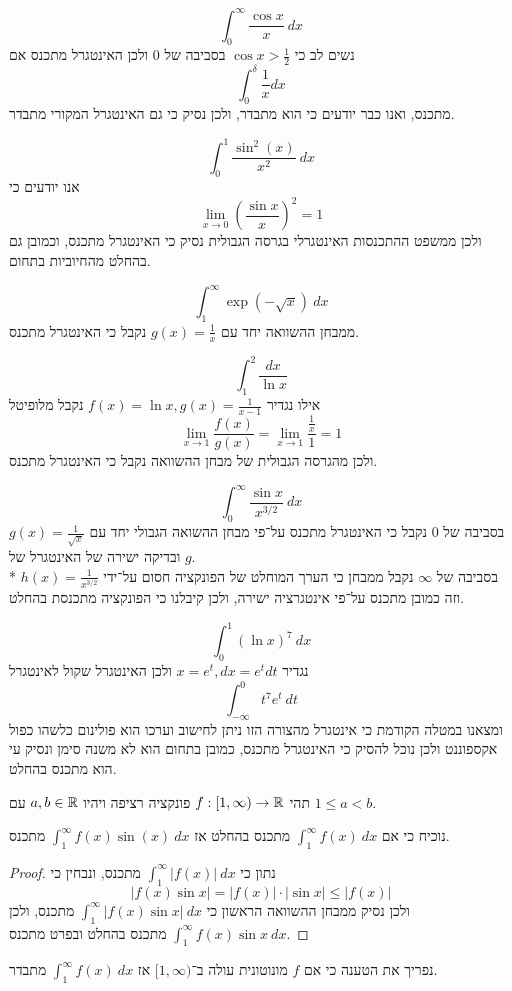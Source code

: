 \Subquestion{}
\[
	\int_{0}^{\infty} \frac{\cos x}{x}\ dx
\]
נשים לב כי $\cos x > \frac{1}{2}$ בסביבה של $0$ ולכן האינטגרל מתכנס אם
\[
	\int_{0}^{\delta} \frac{1}{x} dx
\]
מתכנס, ואנו כבר יודעים כי הוא מתבדר, ולכן נסיק כי גם האינטגרל המקורי מתבדר.

\Subquestion{}
\[
	\int_{0}^{1} \frac{\sin^2(x)}{x^2}\ dx
\]
אנו יודעים כי
\[
	\lim_{x \to 0} {(\frac{\sin x}{x})}^2 = 1
\]
ולכן ממשפט ההתכנסות האינטגרלי בגרסה הגבולית נסיק כי האינטגרל מתכנס, וכמובן גם בהחלט מהחיוביות בתחום.

\Subquestion{}
\[
	\int_{1}^{\infty} \exp(-\sqrt{x})\ dx
\]
ממבחן ההשוואה יחד עם $g(x) = \frac{1}{x}$ נקבל כי האינטגרל מתכנס.

\Subquestion{}
\[
	\int_{1}^{2} \frac{dx}{\ln x}
\]
אילו נגדיר $f(x) = \ln x, g(x) = \frac{1}{x - 1}$ נקבל מלופיטל
\[
	\lim_{x \to 1} \frac{f(x)}{g(x)}
	= \lim_{x \to 1} \frac{\frac{1}{x}}{1}
	= 1
\]
ולכן מהגרסה הגבולית של מבחן ההשוואה נקבל כי האינטגרל מתכנס.

\Subquestion{}
\[
	\int_{0}^{\infty} \frac{\sin x}{x^{3/2}}\ dx
\]
בסביבה של $0$ נקבל כי האינטגרל מתכנס על־פי מבחן ההשואה הגבולי יחד עם $g(x) = \frac{1}{\sqrt{x}}$ ובדיקה ישירה של האינטגרל של $g$. \\*
בסביבה של $\infty$ נקבל ממבחן כי הערך המוחלט של הפונקציה חסום על־ידי $h(x) = \frac{1}{x^{3/2}}$ וזה כמובן מתכנס על־פי אינטגרציה ישירה, ולכן קיבלנו כי הפונקציה מתכנסת בהחלט.

\Subquestion{}
\[
	\int_{0}^{1} {(\ln x)}^7\ dx
\]
נגדיר $x = e^t, dx = e^t dt$ ולכן האינטגרל שקול לאינטגרל
\[
	\int_{-\infty}^{0} t^7 e^t\ dt
\]
ומצאנו במטלה הקודמת כי אינטגרל מהצורה הזו ניתן לחישוב וערכו הוא פולינום כלשהו כפול אקספוננט ולכן נוכל להסיק כי האינטגרל מתכנס, כמובן בתחום הוא לא משנה סימן ונסיק עי הוא מתכנס בהחלט.

\Question{}
תהי $f : [1, \infty) \to \mathbb{R}$ פונקציה רציפה ויהיו $a, b \in \mathbb{R}$ עם $1 \le a < b$.

\Subquestion{}
נוכיח כי אם $\int_{1}^{\infty} f(x)\ dx$ מתכנס בהחלט אז $\int_{1}^{\infty} f(x) \sin(x)\ dx$ מתכנס.
\begin{proof}
	נתון כי $\int_{1}^{\infty} |f(x)|\ dx$ מתכנס, ונבחין כי
	\[
		|f(x) \sin x| = |f(x)| \cdot |\sin x| \le |f(x)|
	\]
	ולכן נסיק ממבחן ההשוואה הראשון כי $\int_{1}^{\infty} |f(x) \sin x|\ dx$ מתכנס, ולכן $\int_{1}^{\infty} f(x) \sin x\ dx$ מתכנס בהחלט ובפרט מתכנס.
\end{proof}

\Subquestion{}
נפריך את הטענה כי אם $f$ מונוטונית עולה ב־$[1, \infty)$ אז $\int_{1}^{\infty} f(x)\ dx$ מתבדר.

